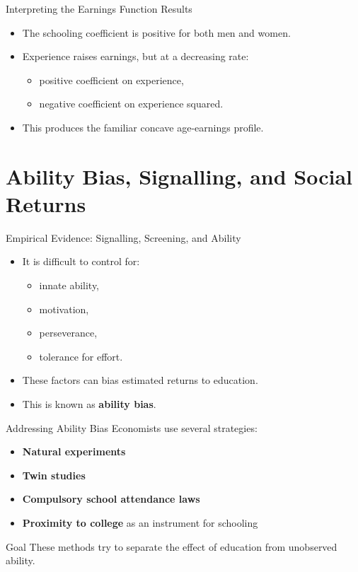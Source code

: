 \documentclass[aspectratio=169]{beamer}
\begin{document}
\begin{frame}{Interpreting the Earnings Function Results}
\transfade
\begin{itemize}
  \item The schooling coefficient is positive for both men and women.
  \item Experience raises earnings, but at a decreasing rate:
  \begin{itemize}
    \item positive coefficient on experience,
    \item negative coefficient on experience squared.
  \end{itemize}
  \item This produces the familiar concave age-earnings profile.
\end{itemize}
\end{frame}

\section{Ability Bias, Signalling, and Social Returns}

\begin{frame}{Empirical Evidence: Signalling, Screening, and Ability}
\transfade
\begin{itemize}
  \item It is difficult to control for:
  \begin{itemize}
    \item innate ability,
    \item motivation,
    \item perseverance,
    \item tolerance for effort.
  \end{itemize}
  \item These factors can bias estimated returns to education.
  \item This is known as \textbf{ability bias}.
\end{itemize}
\end{frame}

\begin{frame}{Addressing Ability Bias}
\transfade
Economists use several strategies:
\begin{itemize}
  \item \textbf{Natural experiments}
  \item \textbf{Twin studies}
  \item \textbf{Compulsory school attendance laws}
  \item \textbf{Proximity to college} as an instrument for schooling
\end{itemize}

\begin{block}{Goal}
These methods try to separate the effect of education from unobserved ability.
\end{block}
\end{frame}
\end{document}
